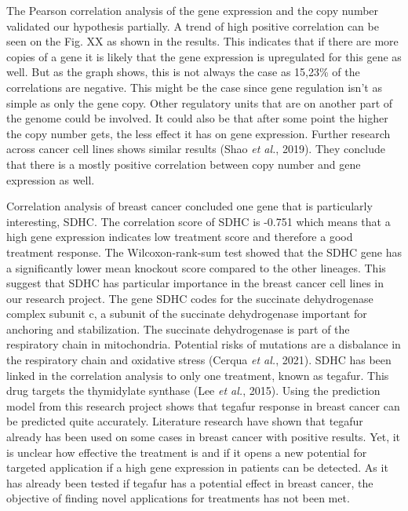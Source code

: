 \documentclass[
  11pt,
]{article}
\begin{document}
The Pearson correlation analysis of the gene expression and the copy
number validated our hypothesis partially. A trend of high positive
correlation can be seen on the Fig. XX as shown in the results. This
indicates that if there are more copies of a gene it is likely that the
gene expression is upregulated for this gene as well. But as the graph
shows, this is not always the case as 15,23\% of the correlations are
negative. This might be the case since gene regulation isn't as simple
as only the gene copy. Other regulatory units that are on another part
of the genome could be involved. It could also be that after some point
the higher the copy number gets, the less effect it has on gene
expression. Further research across cancer cell lines shows similar
results (Shao \emph{et al.}, 2019). They conclude that there is a mostly
positive correlation between copy number and gene expression as well.

Correlation analysis of breast cancer concluded one gene that is
particularly interesting, SDHC. The correlation score of SDHC is -0.751
which means that a high gene expression indicates low treatment score
and therefore a good treatment response. The Wilcoxon-rank-sum test
showed that the SDHC gene has a significantly lower mean knockout score
compared to the other lineages. This suggest that SDHC has particular
importance in the breast cancer cell lines in our research project. The
gene SDHC codes for the succinate dehydrogenase complex subunit c, a
subunit of the succinate dehydrogenase important for anchoring and
stabilization. The succinate dehydrogenase is part of the respiratory
chain in mitochondria. Potential risks of mutations are a disbalance in
the respiratory chain and oxidative stress (Cerqua \emph{et al.}, 2021).
SDHC has been linked in the correlation analysis to only one treatment,
known as tegafur. This drug targets the thymidylate synthase (Lee
\emph{et al.}, 2015). Using the prediction model from this research
project shows that tegafur response in breast cancer can be predicted
quite accurately. Literature research have shown that tegafur already
has been used on some cases in breast cancer with positive results. Yet,
it is unclear how effective the treatment is and if it opens a new
potential for targeted application if a high gene expression in patients
can be detected. As it has already been tested if tegafur has a
potential effect in breast cancer, the objective of finding novel
applications for treatments has not been met.
\end{document}
